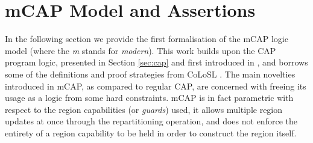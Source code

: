 \section{mCAP Model and Assertions}

\label{sec:mcapModel}

In the following section we provide the first formalisation of the mCAP logic model (where the \textit{m} stands for \textit{modern}). This work builds upon the CAP program logic, presented in Section \ref{sec:cap} and first introduced in \cite{cap}, and borrows some of the definitions and proof strategies from CoLoSL \cite{colosl}. The main novelties introduced in mCAP, as compared to regular CAP, are concerned with freeing its usage as a logic from some hard constraints. mCAP is in fact parametric with respect to the region capabilities (or \textit{guards}) used, it allows multiple region updates at once through the repartitioning operation, and does not enforce the entirety of a region capability to be held in order to construct the region itself.



\newpage



\newpage

